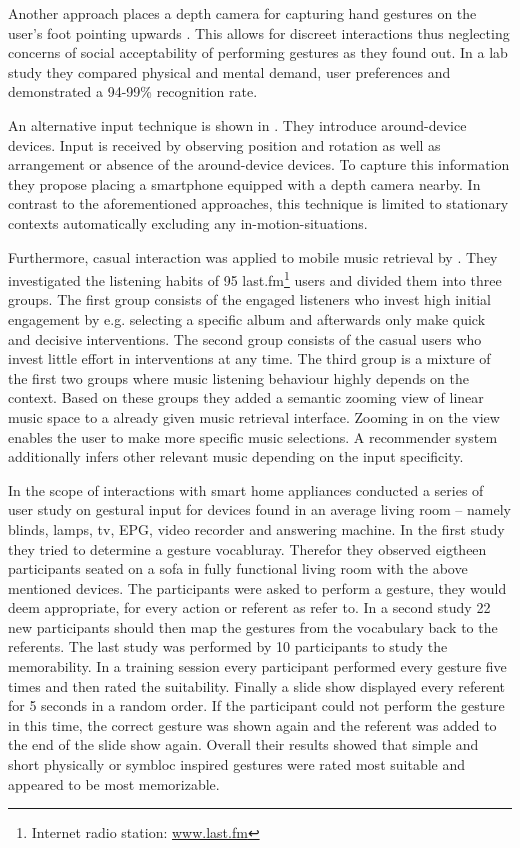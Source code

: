 Another approach places a depth camera for capturing hand gestures on the user's foot pointing upwards \cite{bailly2012shoesense}. This allows for discreet interactions thus neglecting concerns of social acceptability of performing gestures as they found out. In a lab study they compared physical and mental demand, user preferences and demonstrated a 94-99\% recognition rate.

An alternative input technique is shown in \cite{pohl2014around}. They introduce around-device devices. Input is received by observing position and rotation as well as arrangement or absence of the around-device devices. To capture this information they propose placing a smartphone equipped with a depth camera nearby.  In contrast to the aforementioned approaches, this technique is limited to stationary contexts automatically excluding any in-motion-situations.

Furthermore, casual interaction was applied to mobile music retrieval by \cite{boland2015engaging}. They investigated the listening habits of 95 last.fm\footnote{Internet radio station: \url{www.last.fm}} users and divided them into three groups. The first group consists of the engaged listeners who invest high initial engagement by e.g. selecting a specific album and afterwards only make quick and decisive interventions. The second group consists of the casual users who invest little effort in interventions at any time. The third group is a mixture of the first two groups where music listening behaviour highly depends on the context. Based on these groups they added a semantic zooming view of linear music space to a already given music retrieval interface. Zooming in on the view enables the user to make more specific music selections. A recommender system additionally infers other relevant music depending on the input specificity.

In the scope of interactions with smart home appliances \cite{kuhnel2011m} conducted a series of user study on gestural input for devices found in an average living room -- namely blinds, lamps, tv, \ac{EPG}, video recorder and answering machine. In the first study they tried to determine a gesture vocabluray. Therefor they observed eigtheen participants seated on a sofa in fully functional living room with the above mentioned devices. The participants were asked to perform a gesture, they would deem appropriate, for every action or referent as \cite{wobbrock2009user} refer to. In a second study 22 new participants should then map the gestures from the vocabulary back to the referents. The last study was performed by 10 participants to study the memorability. In a training session every participant performed every gesture five times and then rated the suitability. Finally a slide show displayed every referent for 5 seconds in a random order. If the participant could not perform the gesture in this time, the correct gesture was shown again and the referent was added to the end of the slide show again. Overall their results showed that simple and short physically or symbloc inspired gestures were rated most suitable and appeared to be most memorizable. 

